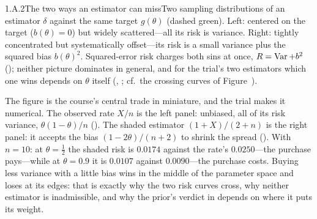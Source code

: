 \documentclass[main.tex]{subfiles}
\begin{document}
\begin{Fig}{1.A.2}{The two ways an estimator can miss}{Two sampling distributions of an
estimator $\delta$ against the same target $g(\theta)$ (dashed green). Left: centered on the
target ($b(\theta)=0$) but widely scattered---all its risk is variance. Right: tightly
concentrated but systematically offset---its risk is a small variance plus the squared bias
$b(\theta)^2$. Squared-error risk charges both sins at once, $R=\operatorname{Var}+b^2$
(); neither picture dominates in general, and for the trial's two estimators which
one wins depends on $\theta$ itself (, ; cf.\ the crossing curves of
Figure~).}
\end{Fig}

\medskip
The figure is the course's central trade in miniature, and the trial makes it numerical. The
observed rate $X/n$ is the left panel: unbiased, all of its risk variance,
$\theta(1-\theta)/n$ (). The shaded estimator $(1+X)/(2+n)$ is the right panel:
it accepts the bias $(1-2\theta)/(n+2)$ to shrink the spread (). With $n=10$: at
$\theta=\tfrac12$ the shaded risk is $0.0174$ against the rate's $0.0250$---the purchase
pays---while at $\theta=0.9$ it is $0.0107$ against $0.0090$---the purchase costs. Buying
less variance with a little bias wins in the middle of the parameter space and loses at its
edges: that is exactly why the two risk curves cross, why neither estimator is inadmissible,
and why the prior's verdict in  depends on where it puts its weight.
\end{document}
